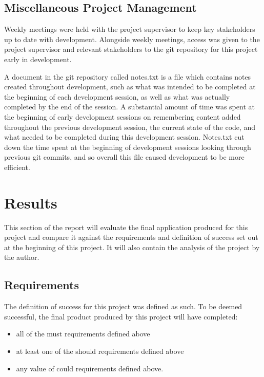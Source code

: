 \documentclass{article}
\begin{document}
\subsection{Miscellaneous Project Management}

Weekly meetings were held with the project supervisor to keep key stakeholders up to date with development. Alongside weekly meetings, access was given to the project supervisor and relevant stakeholders to the git repository for this project early in development. \par

A document in the git repository called notes.txt is a file which contains notes created throughout development, such as what was intended to be completed at the beginning of each development session, as well as what was actually completed by the end of the session. A substantial amount of time was spent at the beginning of early development sessions on remembering content added throughout the previous development session, the current state of the code, and what needed to be completed during this development session. Notes.txt cut down the time spent at the beginning of development sessions looking through previous git commits, and so overall this file caused development to be more efficient. \par

\section{Results}
\label{section:results}

This section of the report will evaluate the final application produced for this project and compare it against the requirements and definition of success set out at the beginning of this project. It will also contain the analysis of the project by the author. 

\subsection{Requirements}

The definition of success for this project was defined as such. To be deemed successful, the final product produced by this project will have completed: 

\begin{itemize}
	\item all of the must requirements defined above
	\item at least one of the should requirements defined above
	\item any value of could requirements defined above.
\end{itemize}
\end{document}
